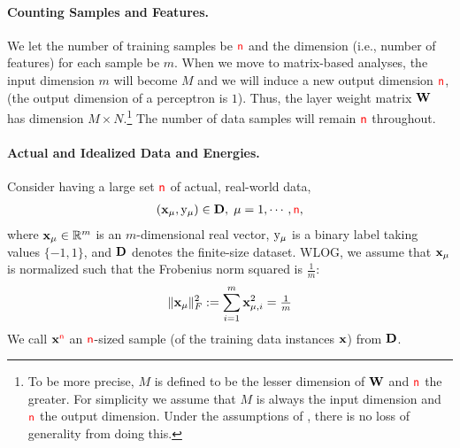 \paragraph{Counting Samples and Features.}
We let the number of training samples be ${\color{red}\sf{n}}$ and the dimension 
(i.e., number of features) for each sample be $m$.
When we move to matrix-based analyses, 
the input dimension $m$ will become $M$ and we will induce a new output dimension ${\color{red}\sf{n}}$, (the output dimension of a perceptron is $1$). Thus, the layer weight matrix ${\mathbf{W}}$ has dimension $M\times N$.\footnote{To be more precise, $M$ is defined to be the lesser dimension of ${\mathbf{W}}$ and ${\color{red}\sf{n}}$ the greater. For simplicity we assume that $M$ is always the input dimension and ${\color{red}\sf{n}}$ the output dimension. Under the assumptions of \SETOL, there is no loss of generality from doing this.} The number of data samples will remain ${\color{red}\sf{n}}$ throughout.



\paragraph{Actual and Idealized Data and Energies.}

Consider having a large set ${\color{red}\sf{n}}$ of actual, real-world data, 
\begin{align}
  \label{eqn:x}
  \left( {\mathbf{x}}_{\mu}, \mathrm{y}_{\mu} \right) \in\mathbf{D},\;\mu=1, \cdots, {\color{red}\sf{n}},
\end{align}
where 
${\mathbf{x}}_{\mu}\in\mathbb{R}^{m}$ is an $m$-dimensional real vector, 
$\mathrm{y}_{\mu}$ is a binary label taking values $\{-1,1\}$, and 
$\mathbf{D}$ denotes the finite-size dataset.
WLOG, we assume that ${\mathbf{x}}_{\mu}$ is normalized such that the Frobenius norm squared is $\tfrac{1}{m}$:
\begin{equation}
  \label{eqn:XVEC_norm}
  \Vert{\mathbf{x}}_{\mu}\Vert^{2}_{F} := \sum_{i=1}^{m} {\mathbf{x}}_{\mu,i}^{2}=\tfrac{1}{m}
\end{equation}
We call ${\mathbf{x}}^{{\color{red}\sf{n}}}$ an ${\color{red}\sf{n}}$-sized sample (of the training data instances ${\mathbf{x}}$) from $\mathbf{D}$. 

